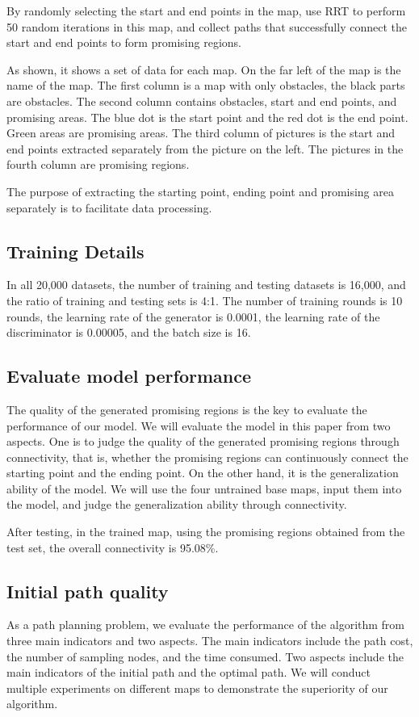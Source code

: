 \documentclass[smallcondensed]{svjour3}     %
\begin{document}
By randomly selecting the start and end points in the map, use RRT to perform 50 random iterations in this map, and collect paths that successfully connect the start and end points to form promising regions.

As shown, it shows a set of data for each map.
On the far left of the map is the name of the map.
The first column is a map with only obstacles, the black parts are obstacles.
The second column contains obstacles, start and end points, and promising areas.
The blue dot is the start point and the red dot is the end point.
Green areas are promising areas.
The third column of pictures is the start and end points extracted separately from the picture on the left.
The pictures in the fourth column are promising regions.

The purpose of extracting the starting point, ending point and promising area separately is to facilitate data processing.

\subsection{Training Details}
In all 20,000 datasets, the number of training and testing datasets is 16,000, and the ratio of training and testing sets is 4:1. 
The number of training rounds is 10 rounds, the learning rate of the generator is 0.0001, the learning rate of the discriminator is 0.00005, and the batch size is 16.

\subsection{Evaluate model performance}
The quality of the generated promising regions is the key to evaluate the performance of our model.
We will evaluate the model in this paper from two aspects. One is to judge the quality of the generated promising regions through connectivity, that is, whether the promising regions can continuously connect the starting point and the ending point.
On the other hand, it is the generalization ability of the model. We will use the four untrained base maps, input them into the model, and judge the generalization ability through connectivity.

After testing, in the trained map, using the promising regions obtained from the test set, the overall connectivity is 95.08\%.

\subsection{Initial path quality}
As a path planning problem, we evaluate the performance of the algorithm from three main indicators and two aspects.
The main indicators include the path cost, the number of sampling nodes, and the time consumed.
Two aspects include the main indicators of the initial path and the optimal path.
We will conduct multiple experiments on different maps to demonstrate the superiority of our algorithm.
\end{document}

